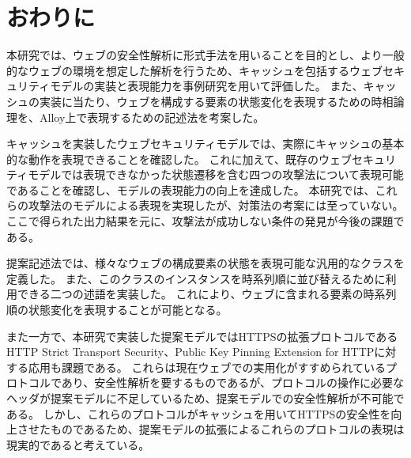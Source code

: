 \documentclass[journal]{IEEEtran}
\begin{document}
\section{おわりに}
本研究では、ウェブの安全性解析に形式手法を用いることを目的とし、より一般的なウェブの環境を想定した解析を行うため、キャッシュを包括するウェブセキュリティモデルの実装と表現能力を事例研究を用いて評価した。
また、キャッシュの実装に当たり、ウェブを構成する要素の状態変化を表現するための時相論理を、Alloy上で表現するための記述法を考案した。

キャッシュを実装したウェブセキュリティモデルでは、実際にキャッシュの基本的な動作を表現できることを確認した。
これに加えて、既存のウェブセキュリティモデルでは表現できなかった状態遷移を含む四つの攻撃法について表現可能であることを確認し、モデルの表現能力の向上を達成した。
本研究では、これらの攻撃法のモデルによる表現を実現したが、対策法の考案には至っていない。
ここで得られた出力結果を元に、攻撃法が成功しない条件の発見が今後の課題である。

提案記述法では、様々なウェブの構成要素の状態を表現可能な汎用的なクラスを定義した。
また、このクラスのインスタンスを時系列順に並び替えるために利用できる二つの述語を実装した。
これにより、ウェブに含まれる要素の時系列順の状態変化を表現することが可能となる。

また一方で、本研究で実装した提案モデルではHTTPSの拡張プロトコルであるHTTP Strict Transport Security\cite{hsts}、Public Key Pinning Extension for HTTP\cite{hpkp}に対する応用も課題である。
これらは現在ウェブでの実用化がすすめられているプロトコルであり、安全性解析を要するものであるが、プロトコルの操作に必要なヘッダが提案モデルに不足しているため、提案モデルでの安全性解析が不可能である。
しかし、これらのプロトコルがキャッシュを用いてHTTPSの安全性を向上させたものであるため、提案モデルの拡張によるこれらのプロトコルの表現は現実的であると考えている。
\end{document}

